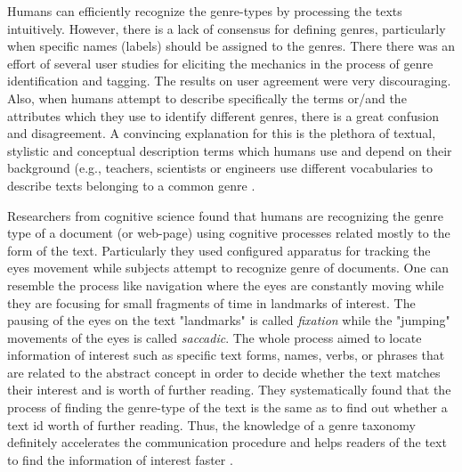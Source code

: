 Humans can efficiently recognize the genre-types by processing the texts intuitively. However, there is a lack of consensus for defining genres, particularly when specific names (labels) should be assigned to the genres. There there was an effort of several user studies for eliciting the mechanics in the process of genre identification and tagging. The results on user agreement were very discouraging. Also, when humans attempt to describe specifically the terms or/and the attributes which they use to identify different genres, there is a great confusion and disagreement. A convincing explanation for this is the plethora of textual, stylistic and conceptual description terms which humans use and depend on their background (e.g., teachers, scientists or engineers use different vocabularies to describe texts belonging to a common genre \parencite{roussinov2001genre, crowston2011problems}. 

Researchers from cognitive science found that humans are recognizing the genre type of a document (or web-page) using cognitive processes related mostly to the form of the text. Particularly they used configured apparatus for tracking the eyes movement while subjects attempt to recognize genre of documents. One can resemble the process like navigation where the eyes are constantly moving while they are focusing for small fragments of time in landmarks of interest. The pausing of the eyes on the text "landmarks" is called \textit{fixation} while the "jumping" movements of the eyes is called \textit{saccadic}. The whole process aimed to locate information of interest such as specific text forms, names, verbs, or phrases that are related to the abstract concept in order to decide whether the text matches their interest and is worth of further reading. They systematically found that the process of finding the genre-type of the text is the same as to find out whether a text id worth of further reading. Thus, the knowledge of a genre taxonomy definitely accelerates the communication procedure and helps readers of the text to find the information of interest faster \parencite{clark2014you}.

